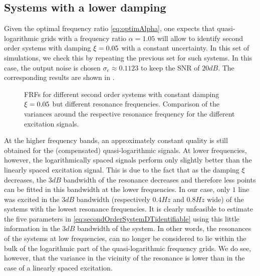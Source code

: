   \subsection{Systems with a lower damping}
  Given the optimal frequency ratio \eqref{eq:optimAlpha}, one expects that quasi-logarithmic grids with a frequency ratio $\alpha = 1.05$ will allow to identify second order systems with damping $\damping = 0.05$ with a constant uncertainty.
  In this set of simulations, we check this by repeating the previous set for such systems.
  In this case, the output noise is chosen $\sigma_e \approx 0.1123$ to keep the SNR of $20\unit{dB}$.
  The corresponding results are shown in .
 
  \begin{figure}%
    \centering
    \setlength\figureheight{5cm}
    \setlength{}
    
    \caption[Simulated FRFs and their variances of systems with $\damping=0.05$ for different excitation signals.]{FRFs for different second order systems with constant damping
             $\damping=0.05$ but different resonance frequencies. Comparison of the
             variances around the respective resonance frequency for the different
             excitation signals.}%
    \label{fig:damping005}
  \end{figure}

  At the higher frequency bands, an approximately constant quality is still obtained for the (compensated) quasi-logarithmic signals.
  At lower frequencies, however, the logarithmically spaced signals perform only slightly better than the linearly spaced excitation signal.
  This is due to the fact that as the damping $\xi$ decreases, the $3\unit{dB}$ bandwidth of the resonance decreases and therefore less points can be fitted in this bandwidth at the lower frequencies.
  In our case, only $1$ line was excited in the $3 \unit{dB}$ bandwidth (respectively $0.4 \unit{Hz}$ and $0.8\unit{Hz}$ wide) of the systems with the lowest resonance frequencies.
  It is clearly unfeasible to estimate the five parameters in
  \eqref{eq:secondOrderSystemDTidentifiable} using this little information in the $3\unit{dB}$ bandwidth of the system.
  In other words, the resonances of the systems at low frequencies, can no longer be considered to lie within the bulk of the logarithmic part of the quasi-logarithmic frequency grids.
  We do see, however, that the variance in the vicinity of the resonance is lower than in the case of a linearly spaced excitation.
  
